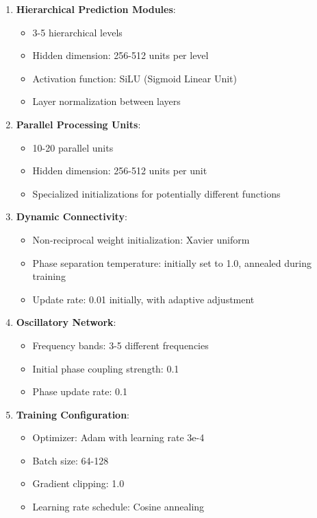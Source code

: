 \documentclass[11pt,a4paper,twocolumn]{article}
\begin{document}
\begin{enumerate}
    \item \textbf{Hierarchical Prediction Modules}:
    \begin{itemize}
        \item 3-5 hierarchical levels
        \item Hidden dimension: 256-512 units per level
        \item Activation function: SiLU (Sigmoid Linear Unit)
        \item Layer normalization between layers
    \end{itemize}

    \item \textbf{Parallel Processing Units}:
    \begin{itemize}
        \item 10-20 parallel units
        \item Hidden dimension: 256-512 units per unit
        \item Specialized initializations for potentially different functions
    \end{itemize}

    \item \textbf{Dynamic Connectivity}:
    \begin{itemize}
        \item Non-reciprocal weight initialization: Xavier uniform
        \item Phase separation temperature: initially set to 1.0, annealed during training
        \item Update rate: 0.01 initially, with adaptive adjustment
    \end{itemize}

    \item \textbf{Oscillatory Network}:
    \begin{itemize}
        \item Frequency bands: 3-5 different frequencies
        \item Initial phase coupling strength: 0.1
        \item Phase update rate: 0.1
    \end{itemize}

    \item \textbf{Training Configuration}:
    \begin{itemize}
        \item Optimizer: Adam with learning rate 3e-4
        \item Batch size: 64-128
        \item Gradient clipping: 1.0
        \item Learning rate schedule: Cosine annealing
    \end{itemize}
\end{enumerate}
\end{document}

